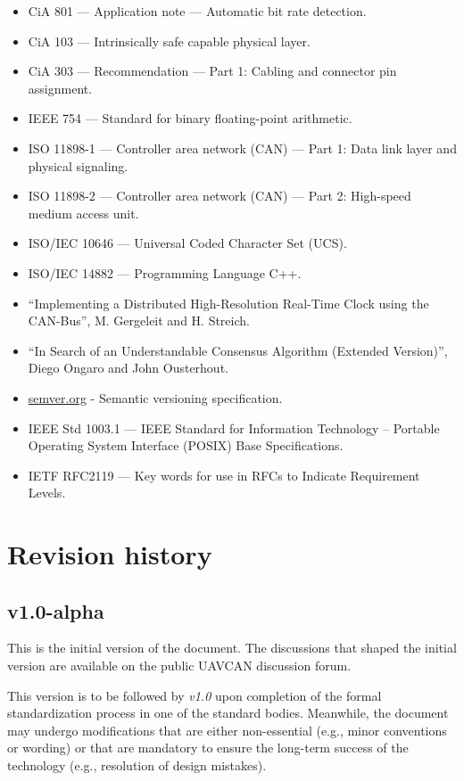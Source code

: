 \begin{itemize}
    \item CiA 801 --- Application note --- Automatic bit rate detection.
    \item CiA 103 --- Intrinsically safe capable physical layer.
    \item CiA 303 --- Recommendation --- Part 1: Cabling and connector pin assignment.
    \item IEEE 754 --- Standard for binary floating-point arithmetic.
    \item ISO 11898-1 --- Controller area network (CAN) --- Part 1: Data link layer and physical signaling.
    \item ISO 11898-2 --- Controller area network (CAN) --- Part 2: High-speed medium access unit.
    \item ISO/IEC 10646 --- Universal Coded Character Set (UCS).
    \item ISO/IEC 14882 --- Programming Language C++.
    \item ``Implementing a Distributed High-Resolution Real-Time Clock using the CAN-Bus'', M. Gergeleit and H. Streich.
    \item ``In Search of an Understandable Consensus Algorithm (Extended Version)'', Diego Ongaro and John Ousterhout.
    \item \href{http://semver.org}{semver.org} - Semantic versioning specification.
    \item IEEE Std 1003.1 --- IEEE Standard for Information Technology --
    Portable Operating System Interface (POSIX) Base Specifications.
    \item IETF RFC2119 --- Key words for use in RFCs to Indicate Requirement Levels.
\end{itemize}

\section{Revision history}

\subsection{v1.0-alpha}

This is the initial version of the document.
The discussions that shaped the initial version are available on the public UAVCAN discussion forum.

This version is to be followed by \emph{v1.0} upon completion of the formal standardization process
in one of the standard bodies.
Meanwhile, the document may undergo modifications that are either non-essential (e.g., minor conventions or wording)
or that are mandatory to ensure the long-term success of the technology (e.g., resolution of design mistakes).

